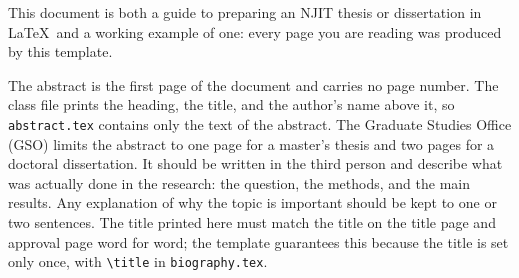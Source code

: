 %
%
%

This document is both a guide to preparing an NJIT thesis or dissertation in \LaTeX\ and a working example of one: every page you are reading was produced by this template.

The abstract is the first page of the document and carries no page number. The class file prints the heading, the title, and the author's name above it, so \texttt{abstract.tex} contains only the text of the abstract. The Graduate Studies Office (GSO) limits the abstract to one page for a master's thesis and two pages for a doctoral dissertation. It should be written in the third person and describe what was actually done in the research: the question, the methods, and the main results. Any explanation of why the topic is important should be kept to one or two sentences. The title printed here must match the title on the title page and approval page word for word; the template guarantees this because the title is set only once, with \verb+\title+ in \texttt{biography.tex}.
